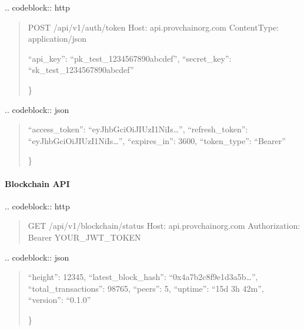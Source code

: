 \documentclass[letterpaper,10pt,english]{sphinxmanual}
\begin{document}
\sphinxAtStartPar
{}
.. code\sphinxhyphen{}block:: http
\begin{quote}

\sphinxAtStartPar
POST /api/v1/auth/token
Host: api.provchain\sphinxhyphen{}org.com
Content\sphinxhyphen{}Type: application/json
\begin{description}
\sphinxlineitem{\{}
\sphinxAtStartPar
“api\_key”: “pk\_test\_1234567890abcdef”,
“secret\_key”: “sk\_test\_1234567890abcdef”

\end{description}

\sphinxAtStartPar
\}
\end{quote}

\sphinxAtStartPar
{}
.. code\sphinxhyphen{}block:: json
\begin{quote}
\begin{description}
\sphinxlineitem{\{}
\sphinxAtStartPar
“access\_token”: “eyJhbGciOiJIUzI1NiIs…”,
“refresh\_token”: “eyJhbGciOiJIUzI1NiIs…”,
“expires\_in”: 3600,
“token\_type”: “Bearer”

\end{description}

\sphinxAtStartPar
\}
\end{quote}


\paragraph{Blockchain API}
\label{\detokenize{api/index:blockchain-api}}
\sphinxAtStartPar
{}
.. code\sphinxhyphen{}block:: http
\begin{quote}

\sphinxAtStartPar
GET /api/v1/blockchain/status
Host: api.provchain\sphinxhyphen{}org.com
Authorization: Bearer YOUR\_JWT\_TOKEN
\end{quote}

\sphinxAtStartPar
{}
.. code\sphinxhyphen{}block:: json
\begin{quote}
\begin{description}
\sphinxlineitem{\{}
\sphinxAtStartPar
“height”: 12345,
“latest\_block\_hash”: “0x4a7b2c8f9e1d3a5b…”,
“total\_transactions”: 98765,
“peers”: 5,
“uptime”: “15d 3h 42m”,
“version”: “0.1.0”

\end{description}

\sphinxAtStartPar
\}
\end{quote}
\end{document}
